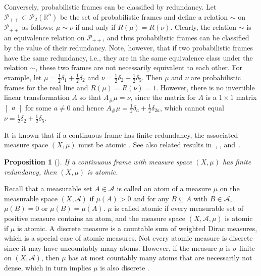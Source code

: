 \documentclass{amsart}
\numberwithin{equation}{section}
\theoremstyle{plain}
\newtheorem{proposition}[theorem]{Proposition}
\theoremstyle{remark}
\theoremstyle{definition}
\begin{document}
Conversely, probabilistic frames can be classified by redundancy. Let $\mathcal{P}_{++} \subset \mathcal{P}_2(\mathbb{R}^n)$ be the set of probabilistic frames and define a relation $\sim$ on $\mathcal{P}_{++}$ as follows: $\mu \sim \nu$ if and only if $R(\mu) = R(\nu)$. Clearly, the relation $\sim$ is an equivalence relation on $\mathcal{P}_{++}$, and thus probabilistic frames can be classified by the value of their redundancy. 
Note, however, that if two probabilistic frames have the same redundancy, i.e., they are in the same equivalence class under the relation $\sim$,  these two frames are not necessarily equivalent to each other. For example, let $\mu = \frac{1}{2}\delta_{1} +\frac{1}{2}\delta_{2}$ and $\nu = \frac{1}{2}\delta_{2} +\frac{1}{2}\delta_{5}$. Then $\mu$ and $\nu$ are probabilistic frames for the real line and $R(\mu) = R(\nu)=1$. However, there is no invertible linear transformation $A$ so that $A_\#\mu=\nu$, since the matrix for $A$ is a $1 \times 1$ matrix $\begin{bmatrix} a \end{bmatrix}$ for some $a \neq 0$ and hence $A_\#\mu = \frac{1}{2}\delta_{a} +\frac{1}{2}\delta_{2a}$, which cannot equal $\nu = \frac{1}{2}\delta_{2} +\frac{1}{2}\delta_{5}$. 

It is known that if a continuous frame has finite redundancy, the associated measure space $(X, \mu)$ must be atomic \cite{speckbacher2019frames}. See also related results in~\cite[Theorem 2]{hosseini2013structure},
\cite[Theorem 2.2]{hemmat2001generalized}, and~\cite[Proposition~3.3]{jakobsen2016density}.


\begin{proposition}[{\cite[Proposition 9]{speckbacher2019frames}}]\label{prop:fd RKHS atomic}
    If a continuous frame with measure space $(X, \mu)$ has finite redundancy, then $(X, \mu)$ is atomic.
\end{proposition}


Recall that a measurable set $A \in \mathcal{A}$ is called an atom of a measure $\mu$ on the measurable space $(X, \mathcal{A})$ if
$\mu(A) > 0$ and for any $B \subseteq A$ with $B \in \mathcal{A}$, 
$\mu(B) = 0$ or $\mu(B) = \mu(A)$.
$\mu$ is called atomic if every measurable set of positive measure contains an atom, and the measure space $(X, \mathcal{A}, \mu)$ is atomic if $\mu$ is atomic. A discrete measure is a countable sum of weighted Dirac measures, which is a special case of atomic measures. 
Not every atomic measure is discrete since it may have uncountably many atoms. However, if the measure $\mu$ is $\sigma$-finite on $(X, \mathcal{A})$, then $\mu$ has at most countably many atoms that are necessarily not dense, which in turn implies $\mu$ is also discrete \cite[p.~31]{chung2000course}. 
\end{document}
